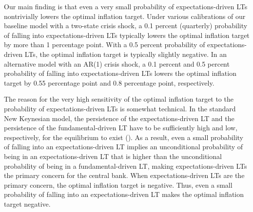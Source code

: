 \documentclass[11pt]{article}
\begin{document}
	Our main finding is that even a very small probability of expectations-driven LTs nontrivially lowers the optimal inflation target. Under various calibrations of our baseline model with a two-state crisis shock, a 0.1 percent (quarterly) probability of falling into expectations-driven LTs typically lowers the optimal inflation target by more than 1 percentage point. With a 0.5 percent probability of expectations-driven LTs, the optimal inflation target is typically slightly negative. In an alternative model with an AR(1) crisis shock, a 0.1 percent and 0.5 percent probability of falling into expectations-driven LTs lowers the optimal inflation target by 0.55 percentage point and 0.8 percentage point, respectively.
	
	
	The reason for the very high sensitivity of the optimal inflation target to the probability of expectations-driven LTs is somewhat technical. In the standard New Keynesian model, the persistence of the expectations-driven LT and the persistence of the fundamental-driven LT have to be sufficiently high and low, respectively, for the equilibrium to exist (\citet{NakataSchmidt2019}). As a result, even a small probability of falling into an expectations-driven LT implies an unconditional probability of being in an expectations-driven LT that is higher than the unconditional probability of being in a fundamental-driven LT, making expectations-driven LTs the primary concern for the central bank. When expectations-driven LTs are the primary concern, the optimal inflation target is negative. Thus, even a small probability of falling into an expectations-driven LT makes the optimal inflation target negative.
	
	
\end{document}
